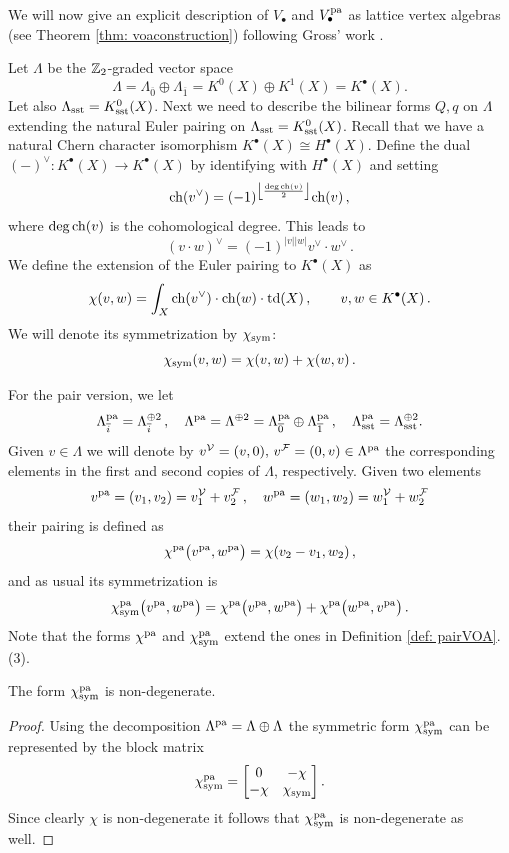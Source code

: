 \documentclass[a4paper, 12pt]{amsart}
\begin{document}
We will now give an explicit description of $V_\bullet$ and $V^{\pa}_\bullet$ as lattice vertex algebras (see Theorem \ref{thm: voaconstruction}) following Gross' work \cite{Gr19}.  
 
Let $\Lambda$ be the $\BZ_2$-graded vector space
\[\Lambda=\Lambda_{\overline{0}}\oplus \Lambda_{\overline{1}}=K^0(X)\oplus K^1(X)=K^\bullet(X).\]
Let also $\Lambda_\sst=K_\sst^0(X)$. Next we need to describe the bilinear forms $Q, q$ on $\Lambda$ extending the natural Euler pairing on $\Lambda_\sst=K_\sst^0(X)$. Recall that we have a natural Chern character isomorphism $K^\bullet(X)\cong H^\bullet(X)$.  Define the dual $(-)^\vee\colon K^\bullet(X)\to K^\bullet(X)$ by identifying with $H^\bullet(X)$ and setting
$$
\ch(v^\vee) = (-1)^{\floor*{ \frac{\deg\ch(v)}{2}}}\ch(v)\,,
$$
where $\deg\ch(v)$ is the cohomological degree. This leads to \begin{equation}
\label{Eq: splittingduals}
(v\cdot w)^\vee = (-1)^{|v||w|}v^\vee\cdot w^\vee\,.
\end{equation}
We define the extension of the Euler pairing to $K^\bullet(X)$ as
$$
\chi(v,w) = \int_X \ch(v^\vee)\cdot \ch(w)\cdot \td(X)\,,\qquad v,w\in K^\bullet(X)\,.
$$
We will denote its symmetrization by $\chi_\sym$:
\[\chi_\sym(v,w)=\chi(v,w)+\chi(w,v)\,.\]

For the pair version, we let 
\[\Lambda^{\pa}_{\overline{i}} = \Lambda_{\overline{i}}^{\oplus 2}\,,\quad \Lambda^{\pa} =\Lambda^{\oplus 2}=\Lambda^{\pa}_{\ovZ}\oplus \Lambda^{\pa}_{\ovO}\,,\quad \Lambda^{\pa}_\sst=\Lambda_\sst^{\oplus 2}.\]
Given $v\in \Lambda$ we will denote by $v^\CV=(v,0),\, v^\CF=(0,v)\in \Lambda^{\pa}$ the corresponding elements in the first and second copies of $\Lambda$, respectively. Given two elements 
\[v^{\pa}=(v_1, v_2)=v^\CV_1 + v^\CF_2\,,\quad w^{\pa}=(w_1, w_2)=w^\CV_1 + w^\CF_2\]
their pairing is defined as
\begin{equation}
\label{Eq: chipa}
\chi^{\pa}\big(v^{\pa},w^{\pa}\big) =  \chi(v_2-v_1,w_2) \,,
\end{equation}
and as usual its symmetrization is
\begin{equation}
\label{Eq: chipasym}
\chi^{\pa}_\sym\big(v^{\pa},w^{\pa}\big) = \chi^{\pa}\big(v^{\pa},w^{\pa}\big)+\chi^{\pa}\big(w^{\pa},v^{\pa}\big) \,.
\end{equation}
Note that the forms $\chi^{\pa}$ and $\chi^{\pa}_{\sym}$ extend the ones in Definition \ref{def: pairVOA}.(3).


\begin{lemma}
\label{Lem: nondegenerate}
The form $\chi^{\pa}_{\sym}$ is non-degenerate.
\end{lemma}
\begin{proof}
Using the decomposition $\Lambda^{\pa}=\Lambda\oplus \Lambda$ the symmetric form $\chi^{\pa}_{\sym}$ can be represented by the block matrix
\[\chi^{\pa}_{\sym}=\begin{bmatrix}
0&-\chi\\
-\chi& \chi_\sym
\end{bmatrix}.\]
Since clearly $\chi$ is non-degenerate it follows that $\chi^{\pa}_{\sym}$ is non-degenerate as well.
\end{proof}
\end{document}
